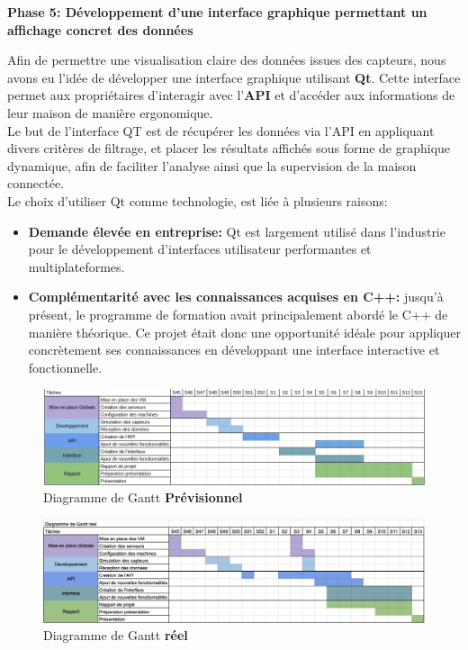 \documentclass[10pt, a4paper]{report}
\begin{document}
	
	\textbf{Phase 5: Développement d'une interface graphique  permettant un affichage concret des données}
	
	Afin de permettre une visualisation claire des données issues des capteurs, nous avons eu l'idée de développer une interface graphique utilisant \textbf{Qt}. Cette interface permet aux propriétaires d'interagir avec l'\textbf{API}
	et d'accéder aux informations de leur maison de manière ergonomique.\\
	Le but de l'interface QT est de récupérer les données via l'API en appliquant divers critères de filtrage, et placer les résultats affichés sous forme de graphique dynamique, afin de faciliter l'analyse ainsi que la supervision de la maison connectée.\\
	Le choix d'utiliser Qt comme technologie, est liée à plusieurs raisons:\\
	\begin{itemize}
		\item \textbf{Demande élevée en entreprise: } Qt est largement utilisé dans l’industrie pour le développement d’interfaces utilisateur performantes et multiplateformes.
		\item \textbf{Complémentarité avec les connaissances acquises en C++:} jusqu’à présent, le programme de formation avait principalement abordé le C++ de manière théorique. Ce projet était donc une opportunité idéale pour appliquer concrètement ses connaissances en développant une interface interactive et fonctionnelle.
	\end{itemize}
	\vspace{3cm}
	\begin{figure}[h!]
		\centering
		\includegraphics[width=1\textwidth]{ressources/img/Gantt/diagrammePrevisionnel}
		\caption{Diagramme de Gantt \textbf{Prévisionnel}}
		\label{fig:GanttPrevisionnel}
	\end{figure}
		\begin{figure}[h!]
		\centering
		\includegraphics[width=1\textwidth]{ressources/img/Gantt/diagrammeReel}
		\caption{Diagramme de Gantt \textbf{réel}}
		\label{fig:GanttReel}
	\end{figure}
	
\end{document}
